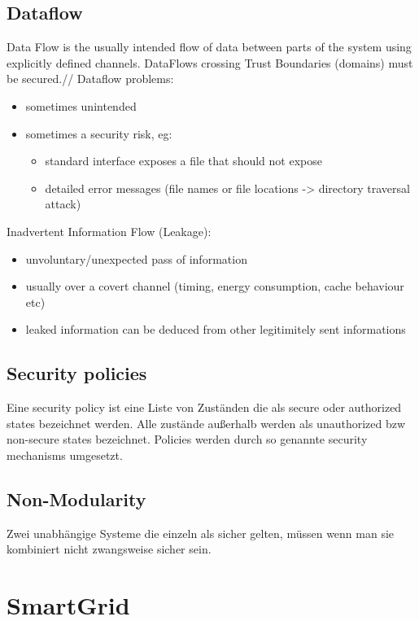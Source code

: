 \documentclass[a4paper, 12pt]{article}
\begin{document}
\subsection{Dataflow}
Data Flow is the usually intended flow of data between parts of the system using explicitly defined channels. DataFlows crossing Trust Boundaries (domains) must be secured.//
Dataflow problems:
\begin{itemize}
\item sometimes unintended
\item sometimes a security risk, eg:
\begin{itemize}
\item standard interface exposes a file that should not expose
\item detailed error messages (file names or file locations -> directory traversal attack)
\end{itemize} 
\end{itemize}

Inadvertent Information Flow (Leakage):\\
\begin{itemize}
\item unvoluntary/unexpected pass of information
\item usually over a covert channel (timing, energy consumption, cache behaviour etc)
\item leaked information can be deduced from other legitimitely sent informations
\end{itemize}
\subsection{Security policies}
Eine security policy ist eine Liste von Zuständen die als secure oder authorized states bezeichnet werden. Alle zustände außerhalb werden als unauthorized bzw non-secure states bezeichnet. Policies werden durch so genannte security mechanisms umgesetzt.
\subsection{Non-Modularity}
Zwei unabhängige Systeme die einzeln als sicher gelten, müssen wenn man sie kombiniert nicht zwangsweise sicher sein.
\section{SmartGrid}
\end{document}
